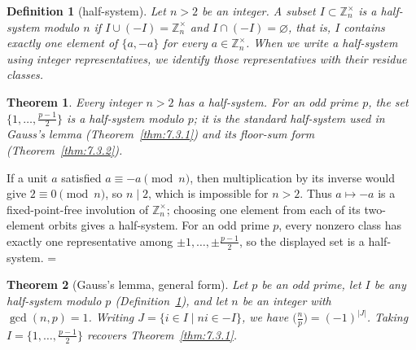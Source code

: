\documentclass[11pt]{article}
\makeatletter
\let\nt@closedisplay\]
\def\nt@guardedclose{\@ifnextchar\par{\nt@closeafterpar}{\@ifnextchar\end{\postdisplaypenalty\@M\nt@closedisplay}{\nt@closedisplay}}}
\def\nt@closeafterpar\par{\@ifnextchar\par{\nt@closeafterpar}{\@ifnextchar\end{\postdisplaypenalty\@M\nt@closedisplay\par}{\nt@closedisplay\par}}}
\renewenvironment{proof}[1][\proofname]{\par
  \pushQED{\qed}\normalfont\topsep\medskipamount\edef\nt@afterproof{\@endparpenalty=\the\@endparpenalty\relax}\@beginparpenalty\@M\@endparpenalty\@M\let\]\nt@guardedclose\trivlist\item[]\textit{#1\@addpunct{.}} \ignorespaces}{\ifvmode\addpenalty\@M\fi\popQED\nt@afterproof\endtrivlist\@endpefalse}
\theoremstyle{ntstyle}
\newtheorem{theorem}{Theorem}[subsection]
\newtheorem{definition}{Definition}[subsection]
\newcommand{\legs}[2]{\bigl(\tfrac{#1}{#2}\bigr)}
\newcommand{\ZmodUnits}[1]{\mathbb{Z}_{#1}^{\times}}
\makeatother
\begin{document}
\begin{definition}[half-system]\label{def:7.3.1}\label{def:half-system} Let $n > 2$ be an
  integer. A subset $I \subset \ZmodUnits{n}$ is a half-system modulo
  $n$ if $I \cup (-I) = \ZmodUnits{n}$ and $I \cap (-I) = \varnothing$, that is, $I$ contains exactly one element
  of $\{a, -a\}$ for every $a \in \ZmodUnits{n}$. When we write a half-system using integer representatives, we
  identify those representatives with their residue classes.

\end{definition}

\begin{theorem}\label{thm:7.3.3} Every
  integer $n>2$ has a half-system. For an odd prime $p$, the set
  $\{1,\ldots,\tfrac{p-1}{2}\}$ is a half-system modulo $p$; it is the
  standard half-system used in Gauss's lemma (Theorem~\ref{thm:7.3.1}) and its
  floor-sum form (Theorem~\ref{thm:7.3.2}).

\end{theorem}

\begin{proof} If a unit $a$ satisfied
  $a\equiv-a\pmod{n}$, then multiplication by its inverse would give
  $2\equiv0\pmod{n}$, so $n\mid2$, which is impossible for $n>2$. Thus $a\mapsto-a$ is a
  fixed-point-free involution of $\ZmodUnits{n}$; choosing one
  element from each of its two-element orbits gives a half-system. For an
  odd prime $p$, every nonzero class has exactly one representative among
  $\pm1,\ldots,\pm\tfrac{p-1}{2}$, so the displayed set is a
  half-system.
\end{proof}

\begin{theorem}[Gauss's lemma, general form]\label{thm:7.3.4}\label{thm:gauss-lemma-general-form}
  Let $p$ be an odd prime, let $I$ be any half-system modulo $p$
  (Definition~\ref{def:7.3.1}), and let $n$ be an integer with $\gcd(n, p) = 1$. Writing $J = \{i \in I \mid ni \in -I\}$, we
  have $\legs{n}{p} = (-1)^{|J|}$. Taking $I = \{1, \ldots, \tfrac{p-1}{2}\}$ recovers Theorem~\ref{thm:7.3.1}.

\end{theorem}
\end{document}
